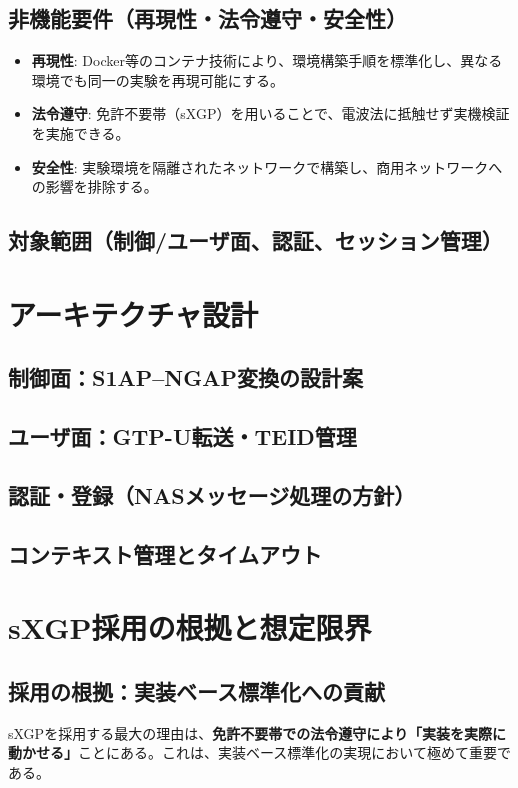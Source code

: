 \subsection{非機能要件（再現性・法令遵守・安全性）}
\begin{itemize}
	\item \textbf{再現性}: Docker等のコンテナ技術により、環境構築手順を標準化し、異なる環境でも同一の実験を再現可能にする。
	\item \textbf{法令遵守}: 免許不要帯（sXGP）を用いることで、電波法に抵触せず実機検証を実施できる。
	\item \textbf{安全性}: 実験環境を隔離されたネットワークで構築し、商用ネットワークへの影響を排除する。
\end{itemize}

\subsection{対象範囲（制御/ユーザ面、認証、セッション管理）}

\section{アーキテクチャ設計}
\subsection{制御面：S1AP–NGAP変換の設計案}
\subsection{ユーザ面：GTP-U転送・TEID管理}
\subsection{認証・登録（NASメッセージ処理の方針）}
\subsection{コンテキスト管理とタイムアウト}

\section{sXGP採用の根拠と想定限界}
\subsection{採用の根拠：実装ベース標準化への貢献}

sXGPを採用する最大の理由は、\textbf{免許不要帯での法令遵守により「実装を実際に動かせる」}ことにある。これは、実装ベース標準化の実現において極めて重要である。

